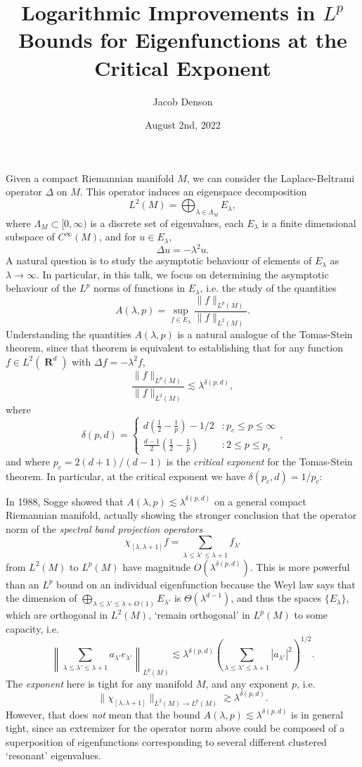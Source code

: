 \documentclass{article}
\title{Logarithmic Improvements in $L^p$ Bounds for Eigenfunctions at the Critical Exponent}
\author{Jacob Denson}
\date{August 2nd, 2022}
\DeclareMathOperator{\RR}{\mathbf{R}}
\theoremstyle{plain}
\theoremstyle{remark}
\theoremstyle{definition}
\begin{document}
\maketitle

Given a compact Riemannian manifold $M$, we can consider the Laplace-Beltrami operator $\Delta$ on $M$. This operator induces an eigenspace decomposition
%
\[ L^2(M) = \bigoplus_{\lambda \in \Lambda_M} E_\lambda, \]
%
where $\Lambda_M \subset [0,\infty)$ is a discrete set of eigenvalues, each $E_\lambda$ is a finite dimensional subspace of $C^\infty(M)$, and for $u \in E_\lambda$,
%
\[ \Delta u = - \lambda^2 u. \]
%
A natural question is to study the asymptotic behaviour of elements of $E_\lambda$ as $\lambda \to \infty$. In particular, in this talk, we focus on determining the asymptotic behaviour of the $L^p$ norms of functions in $E_\lambda$, i.e. the study of the quantities
%
\[ A(\lambda,p) = \sup_{f \in E_\lambda} \frac{\| f \|_{L^p(M)}}{\| f \|_{L^2(M)}}. \]
%
Understanding the quantities $A(\lambda,p)$ is a natural analogue of the Tomas-Stein theorem, since that theorem is equivalent to establishing that for any function $f \in L^2(\RR^d)$ with $\Delta f = - \lambda^2 f$,
%
\[ \frac{\| f \|_{L^p(M)}}{\| f \|_{L^2(M)}} \lesssim \lambda^{\delta(p,d)}, \]
%
where
%
\[ \delta(p,d) = \begin{cases} d( \frac{1}{2} - \frac{1}{p} ) - 1/2 &: p_c \leq p \leq \infty \\ \frac{d-1}{2} \left( \frac{1}{2} - \frac{1}{p} \right) &: 2 \leq p \leq p_c \end{cases}, \]
%
and where $p_c = 2(d+1)/(d-1)$ is the \emph{critical exponent} for the Tomas-Stein theorem. In particular, at the critical exponent we have $\delta(p_c,d) = 1/p_c$:

In 1988, Sogge showed that $A(\lambda,p) \lesssim \lambda^{\delta(p,d)}$ on a general compact Riemannian manifold, actually showing the stronger conclusion that the operator norm of the \emph{spectral band projection operators}
%
\[ \chi_{[\lambda,\lambda + 1]} f = \sum_{\lambda \leq \lambda' \leq \lambda + 1} f_{\lambda'} \]
%
from $L^2(M)$ to $L^p(M)$ have magnitude $O(\lambda^{\delta(p,d)})$. This is more powerful than an $L^p$ bound on an individual eigenfunction because the Weyl law says that the dimension of $\bigoplus_{\lambda \leq \lambda' \leq \lambda + O(1)} E_{\lambda'}$ is $\Theta(\lambda^{d-1})$, and thus the spaces $\{ E_\lambda \}$, which are orthogonal in $L^2(M)$, `remain orthogonal' in $L^p(M)$ to some capacity, i.e.
%
\[ \left\| \sum_{\lambda \leq \lambda' \leq \lambda + 1} a_{\lambda'} e_{\lambda'} \right\|_{L^p(M)} \lesssim \lambda^{\delta(p,d)} \left( \sum_{\lambda \leq \lambda' \leq \lambda + 1} |a_{\lambda'}|^2 \right)^{1/2}. \]
%
The \emph{exponent} here is tight for any manifold $M$, and any exponent $p$, i.e.
%
\[ \| \chi_{[\lambda,\lambda+1]} \|_{L^2(M) \to L^p(M)} \gtrsim \lambda^{\delta(p,d)}. \]
%
However, that does \emph{not} mean that the bound $A(\lambda,p) \lesssim \lambda^{\delta(p,d)}$ is in general tight, since an extremizer for the operator norm above could be composed of a superposition of eigenfunctions corresponding to several different clustered `resonant' eigenvalues.
\end{document}
